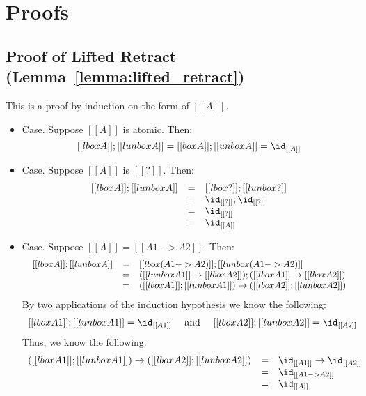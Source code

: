 \section{Proofs}
\label{sec:proofs}

\subsection{Proof of Lifted Retract (Lemma~\ref{lemma:lifted_retract})}
\label{subsec:proof_of_lifted_retract}
This is a proof by induction on the form of $[[A]]$.

\begin{itemize}
\item[] Case. Suppose $[[A]]$ is atomic.  Then:
  \[
    [[lbox A]];[[lunbox A]] = [[box A]];[[unbox A]] = \id_{[[A]]}
    \]
    
  \item[] Case. Suppose $[[A]]$ is $[[?]]$.  Then:
    \[
    \begin{array}{lll}
      [[lbox A]];[[lunbox A]] & = & [[lbox ?]];[[lunbox ?]]\\
      & = & \id_{[[?]]};\id_{[[?]]}\\
      & = & \id_{[[?]]}\\
      & = & \id_{[[A]]}
    \end{array}
    \]

  \item[] Case. Suppose $[[A]] = [[A1 -> A2]]$.  Then:
    \[\small
    \begin{array}{lll}
      [[lbox A]];[[lunbox A]]
      & = & [[lbox (A1 -> A2)]];[[lunbox (A1 -> A2)]]\\
      & = & ([[lunbox A1]] \to [[lbox A2]]);([[lbox A1]] \to [[lbox A2]])\\
      & = & ([[lbox A1]];[[lunbox A1]]) \to ([[lbox A2]];[[lunbox A2]])\\
    \end{array}
    \]
    By two applications of the induction hypothesis we know the
    following:
    \[
    \begin{array}{lll}
      [[lbox A1]];[[lunbox A1]] = \id_{[[A1]]} & \text{ and } & [[lbox A2]];[[lunbox A2]] = \id_{[[A2]]}
    \end{array}
    \]
    Thus, we know the following:
    \[
    \begin{array}{lll}
      ([[lbox A1]];[[lunbox A1]]) \to ([[lbox A2]];[[lunbox A2]])
      & = & \id_{[[A1]]} \to \id_{[[A2]]}\\
      & = & \id_{[[A1 -> A2]]}\\
      & = & \id_{[[A]]}
    \end{array}
    \]


\end{itemize}
